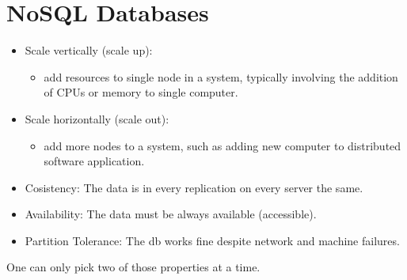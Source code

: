 
\section{NoSQL Databases}

\begin{breakbox}
\begin{itemize}
	\item Scale vertically (scale up):
		\begin{itemize}
			\item add resources to single node in a system, typically involving the addition of CPUs or memory to single computer.
		\end{itemize}
	\item Scale horizontally (scale out):
		\begin{itemize}
			\item add more nodes to a system, such as adding new computer to distributed software application.
		\end{itemize}
\end{itemize}
\end{breakbox}

\begin{breakbox}
\begin{itemize}
	\item \textcolor{Emerald}{C}osistency: The data is in every replication on every server the same.
	\item \textcolor{Emerald}{A}vailability: The data must be always available (accessible).
	\item \textcolor{Emerald}{P}artition Tolerance: The db works fine despite network and machine failures.
\end{itemize}
One can only pick two of those properties at a time.
\end{breakbox}

